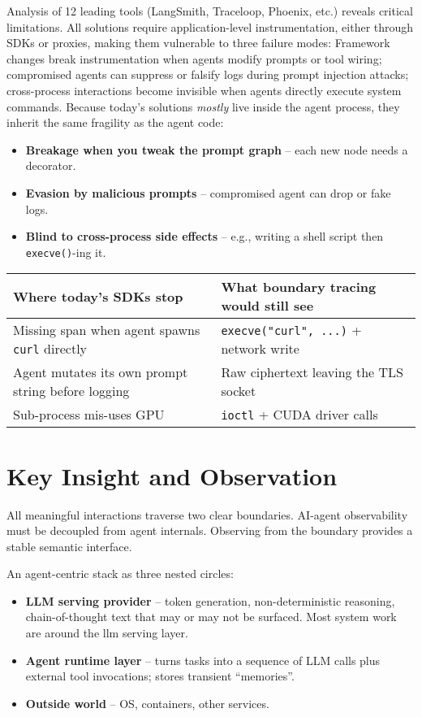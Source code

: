 \documentclass[sigplan,screen，review,9pt]{acmart}
\begin{document}
Analysis of 12 leading tools (LangSmith, Traceloop, Phoenix, etc.) reveals critical limitations. All solutions require application-level instrumentation, either through SDKs or proxies, making them vulnerable to three failure modes: Framework changes break instrumentation when agents modify prompts or tool wiring; compromised agents can suppress or falsify logs during prompt injection attacks; cross-process interactions become invisible when agents directly execute system commands. Because today’s solutions \emph{mostly} live inside the agent process, they inherit the same fragility as the agent code:

\begin{itemize}
  \item \textbf{Breakage when you tweak the prompt graph} – each new node needs a decorator.
  \item \textbf{Evasion by malicious prompts} – compromised agent can drop or fake logs.
  \item \textbf{Blind to cross-process side effects} – e.g., writing a shell script then \verb|execve()|-ing it.
\end{itemize}


\begin{table}[h]
\centering
\small
\begin{tabular}{p{} p{}}
\toprule
\textbf{Where today's SDKs stop} & \textbf{What boundary tracing would still see} \\
\midrule
Missing span when agent spawns \texttt{curl} directly & \texttt{execve("curl", ...)} + network write \\
Agent mutates its own prompt string before logging & Raw ciphertext leaving the TLS socket \\
Sub-process mis-uses GPU & \texttt{ioctl} + CUDA driver calls \\
\bottomrule
\end{tabular}
\end{table}

\section{Key Insight and Observation}

All meaningful interactions traverse two clear boundaries.   AI-agent observability must be decoupled from agent internals.
  Observing from the boundary provides a stable semantic interface.

An agent-centric stack as three nested circles:
\begin{itemize}
  \item \textbf{LLM serving provider} – token generation, non-deterministic reasoning, chain-of-thought text that may or may not be surfaced. Most system work are around the llm serving layer.
  \item \textbf{Agent runtime layer} – turns tasks into a sequence of LLM calls plus external tool invocations; stores transient ``memories''.
  \item \textbf{Outside world} – OS, containers, other services.
\end{itemize}
\end{document}
